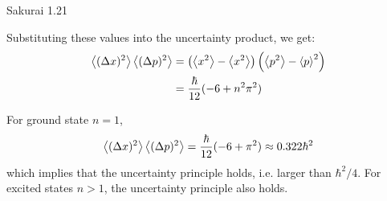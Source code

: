 \documentclass{article}
\begin{document}
\begin{section}{Sakurai 1.21}
\begin{tcolorbox}[breakable]
			Substituting these values into the uncertainty product, we get:
			\begin{align*}
				\left<(\Delta x)^2\right> \left<(\Delta p)^2\right> &= \left(\left<x^2\right> - \left<x^2\right>\right) \left(\left<p^2\right> - \left<p\right>^2\right) \\
				&= \frac{\hbar}{12} (-6 + n^2 \pi^2) \\
			\end{align*}

			For ground state $n=1$, 
			\begin{align*}
				\left<(\Delta x)^2\right> \left<(\Delta p)^2\right> = \frac{\hbar}{12} (-6 + \pi^2) \approx 0.322 \hbar^2
			\end{align*}
			which implies that the uncertainty principle holds, i.e. larger than $\hbar^2/4$. For excited states $n > 1$, the uncertainty principle also holds.
		\end{tcolorbox}
	\end{section}
\end{document}
